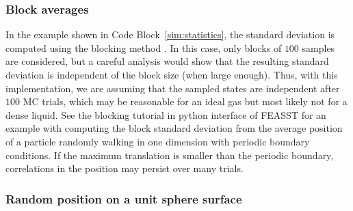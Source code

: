 \documentclass[
  9pt,
  bestpractices,
]{livecoms}
\begin{document}
\subsubsection{\label{sec:block_av}Block averages}

In the example shown in Code Block~\ref{sim:statistics}, the standard deviation is computed using the blocking method \cite{flyvbjerg_error_1989}.
In this case, only blocks of $100$ samples are considered, but a careful analysis would show that the resulting standard deviation is independent of the block size (when large enough).
Thus, with this implementation, we are assuming that the sampled states are independent after $100$ MC trials, which may be reasonable for an ideal gas but most likely not for a dense liquid.
See the blocking tutorial in python interface of FEASST \cite{hatch_monte_2024} for an example with computing the block standard deviation from the average position of a particle randomly walking in one dimension with periodic boundary conditions.
If the maximum translation is smaller than the periodic boundary, correlations in the position may persist over many trials.

\begin{figure}

\end{figure}

\subsubsection{\label{sec:unit_sphere}Random position on a unit sphere surface}
\end{document}
